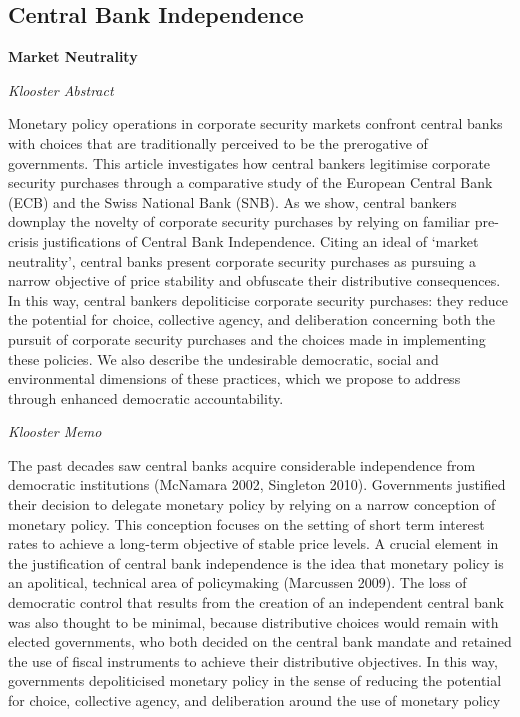 \documentclass[
]{book}
\begin{document}
\hypertarget{central-bank-independence}{%
\subsection{Central Bank Independence}\label{central-bank-independence}}

\textbf{Market Neutrality}

\emph{Klooster Abstract}

Monetary policy operations in corporate security markets confront central
banks with choices that are traditionally perceived to be the prerogative of
governments. This article investigates how central bankers legitimise
corporate security purchases through a comparative study of the
European Central Bank (ECB) and the Swiss National Bank (SNB). As we
show, central bankers downplay the novelty of corporate security
purchases by relying on familiar pre-crisis justifications of Central Bank
Independence. Citing an ideal of `market neutrality', central banks
present corporate security purchases as pursuing a narrow objective of
price stability and obfuscate their distributive consequences. In this way,
central bankers depoliticise corporate security purchases: they reduce
the potential for choice, collective agency, and deliberation concerning
both the pursuit of corporate security purchases and the choices made
in implementing these policies. We also describe the undesirable
democratic, social and environmental dimensions of these practices,
which we propose to address through enhanced democratic
accountability.

\emph{Klooster Memo}

The past decades saw central banks acquire considerable independence from democratic institutions
(McNamara 2002, Singleton 2010). Governments justified their decision to delegate monetary policy
by relying on a narrow conception of monetary policy. This conception focuses on the setting of short
term interest rates to achieve a long-term objective of stable price levels. A crucial element in the
justification of central bank independence is the idea that monetary policy is an apolitical, technical
area of policymaking (Marcussen 2009). The loss of democratic control that results from the creation
of an independent central bank was also thought to be minimal, because distributive choices would
remain with elected governments, who both decided on the central bank mandate and retained the
use of fiscal instruments to achieve their distributive objectives. In this way, governments depoliticised
monetary policy in the sense of reducing the potential for choice, collective agency, and deliberation
around the use of monetary policy
\end{document}
